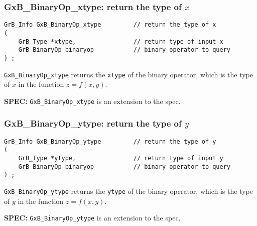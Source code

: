 \documentclass[12pt]{article}
\begin{document}
\subsubsection{{\sf GxB\_BinaryOp\_xtype:} return the type of $x$}
\label{binaryop_xtype}

\begin{mdframed}[userdefinedwidth=6in]
{\footnotesize
\begin{verbatim}
GrB_Info GxB_BinaryOp_xtype         // return the type of x
(
    GrB_Type *xtype,                // return type of input x
    GrB_BinaryOp binaryop           // binary operator to query
) ;
\end{verbatim}
}\end{mdframed}

\verb'GxB_BinaryOp_xtype'
returns the \verb'xtype' of the binary operator, which is the
type of $x$ in the function $z=f(x,y)$.

\begin{spec}
{\bf SPEC:} \verb'GxB_BinaryOp_xtype' is an extension to the spec.
\end{spec}

\subsubsection{{\sf GxB\_BinaryOp\_ytype:} return the type of $y$}
\label{binaryop_ytype}

\begin{mdframed}[userdefinedwidth=6in]
{\footnotesize
\begin{verbatim}
GrB_Info GxB_BinaryOp_ytype         // return the type of y
(
    GrB_Type *ytype,                // return type of input y
    GrB_BinaryOp binaryop           // binary operator to query
) ;
\end{verbatim}
} \end{mdframed}

\verb'GxB_BinaryOp_ytype'
returns the \verb'ytype' of the binary operator, which is the
type of $y$ in the function $z=f(x,y)$.

\begin{spec}
{\bf SPEC:} \verb'GxB_BinaryOp_ytype' is an extension to the spec.
\end{spec}
\end{document}
